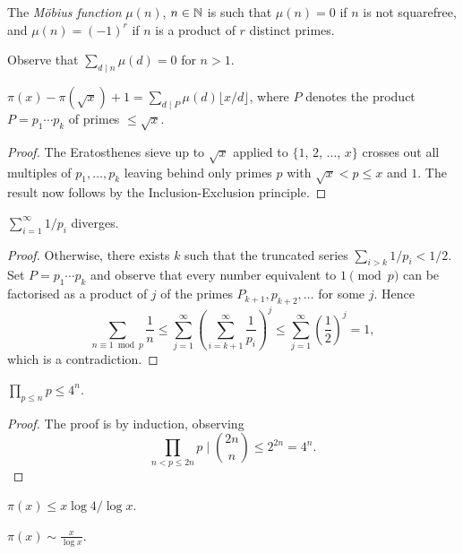 \documentclass[a4paper, 10pt]{amsart}
\begin{document}
\begin{definition}
    The \emph{Möbius function} $\mu(n)$, $n \in \mathbb{N}$ is such that $\mu(n) = 0$ if $n$ is not squarefree, and $\mu(n) = (-1)^r$ if $n$ is a product of $r$ distinct primes. 
\end{definition}

Observe that $\sum_{d \mid n} \mu(d) = 0$ for $n> 1$.

\begin{theorem}
$\pi(x) - \pi(\sqrt{x}) + 1 = \sum_{d \mid P} \mu(d) \lfloor x/d\rfloor$, where $P$ denotes the product $P = p_1 \cdots p_k$ of primes $\leq \sqrt{x}$.
\end{theorem}
\begin{proof}
    The Eratosthenes sieve up to $\sqrt{x}$ applied to $\{1$, $2$, $\dots$, $x\}$ crosses out all multiples of $p_1, \dots, p_k$ leaving behind only primes $p$ with $\sqrt{x} < p \leq x$ and $1$. The result now follows by the Inclusion-Exclusion principle.
\end{proof}

\begin{theorem}
    $\sum_{i = 1}^{\infty} 1/p_i$ diverges.
\end{theorem}
\begin{proof}
    Otherwise, there exists $k$ such that the truncated series $\sum_{i > k} 1/p_i < 1/2$. Set $P = p_1 \cdots p_k$ and observe that every number equivalent to $1\pmod{p}$ can be factorised as a product of $j$ of the primes $P_{k+1}, p_{k+2}, \dots$ for some $j$. Hence
    $$
    \sum_{n \equiv 1 \bmod{p}} \frac{1}{n} \leq \sum_{j = 1}^{\infty} \left(\sum_{i = k + 1}^{\infty} \frac{1}{p_i}\right)^j \leq \sum_{j = 1}^{\infty} \left(\frac{1}{2}\right)^j = 1,
$$
which is a contradiction.
\end{proof}


\begin{theorem}
    $\prod_{p \leq n} p \leq 4^n$.
\end{theorem}
\begin{proof}
The proof is by induction, observing 
$$
\prod_{n < p \leq 2n} p \mid \binom{2n}{n} \leq 2^{2n} = 4^n.
$$
\end{proof}

\begin{corollary}
    $\pi(x) \leq x \log 4/\log x$.
\end{corollary}

\begin{theorem}
$\pi(x) \sim \frac{x}{\log x}$.
\end{theorem}
\end{document}
